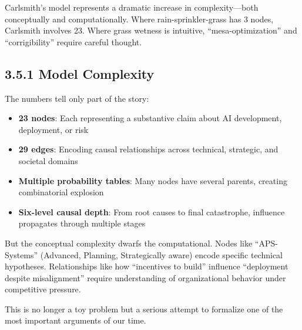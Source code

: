 \documentclass[
  11pt,
  letterpaper,
]{book}
\providecommand{\tightlist}{%
  \setlength{\itemsep}{0pt}\setlength{\parskip}{0pt}}
\begin{document}
Carlsmith's model represents a dramatic increase in complexity---both
conceptually and computationally. Where rain-sprinkler-grass has 3
nodes, Carlsmith involves 23. Where grass wetness is intuitive,
``mesa-optimization'' and ``corrigibility'' require careful thought.

\subsection{3.5.1 Model Complexity}\label{sec-carlsmith-complexity}

The numbers tell only part of the story:

\begin{itemize}
\tightlist
\item
  \textbf{23 nodes}: Each representing a substantive claim about AI
  development, deployment, or risk
\item
  \textbf{29 edges}: Encoding causal relationships across technical,
  strategic, and societal domains
\item
  \textbf{Multiple probability tables}: Many nodes have several parents,
  creating combinatorial explosion
\item
  \textbf{Six-level causal depth}: From root causes to final
  catastrophe, influence propagates through multiple stages
\end{itemize}

But the conceptual complexity dwarfs the computational. Nodes like
``APS-Systems'' (Advanced, Planning, Strategically aware) encode
specific technical hypotheses. Relationships like how ``incentives to
build'' influence ``deployment despite misalignment'' require
understanding of organizational behavior under competitive pressure.

This is no longer a toy problem but a serious attempt to formalize one
of the most important arguments of our time.
\end{document}
